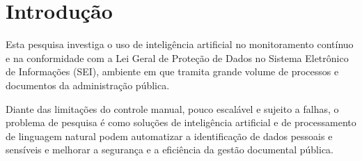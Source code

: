 
\section{Introdução}

Esta pesquisa investiga o uso de inteligência artificial no monitoramento
contínuo e na conformidade com a Lei Geral de Proteção de Dados no Sistema
Eletrônico de Informações (SEI), ambiente em que tramita grande volume de
processos e documentos da administração pública.

Diante das limitações do controle manual, pouco escalável e sujeito a falhas, o
problema de pesquisa é como soluções de inteligência artificial e de
processamento de linguagem natural podem automatizar a identificação de dados
pessoais e sensíveis e melhorar a segurança e a eficiência da gestão documental
pública.
